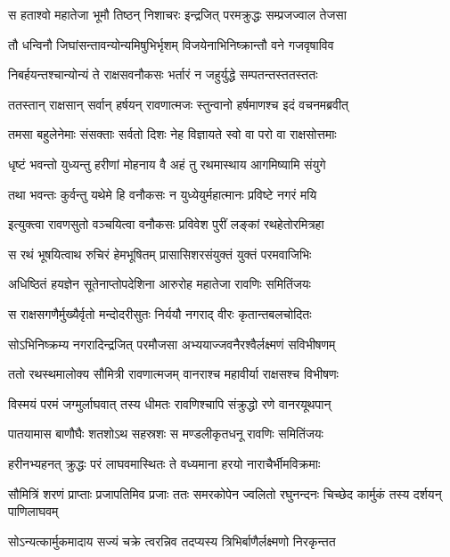 
\twolineshloka
{स हताश्वो महातेजा भूमौ तिष्ठन् निशाचरः}
{इन्द्रजित् परमक्रुद्धः सम्प्रजज्वाल तेजसा} %

\twolineshloka
{तौ धन्विनौ जिघांसन्तावन्योन्यमिषुभिर्भृशम्}
{विजयेनाभिनिष्क्रान्तौ वने गजवृषाविव} %

\twolineshloka
{निबर्हयन्तश्चान्योन्यं ते राक्षसवनौकसः}
{भर्तारं न जहुर्युद्धे सम्पतन्तस्ततस्ततः} %

\twolineshloka
{ततस्तान् राक्षसान् सर्वान् हर्षयन् रावणात्मजः}
{स्तुन्वानो हर्षमाणश्च इदं वचनमब्रवीत्} %

\twolineshloka
{तमसा बहुलेनेमाः संसक्ताः सर्वतो दिशः}
{नेह विज्ञायते स्वो वा परो वा राक्षसोत्तमाः} %

\twolineshloka
{धृष्टं भवन्तो युध्यन्तु हरीणां मोहनाय वै}
{अहं तु रथमास्थाय आगमिष्यामि संयुगे} %

\twolineshloka
{तथा भवन्तः कुर्वन्तु यथेमे हि वनौकसः}
{न युध्येयुर्महात्मानः प्रविष्टे नगरं मयि} %

\twolineshloka
{इत्युक्त्वा रावणसुतो वञ्चयित्वा वनौकसः}
{प्रविवेश पुरीं लङ्कां रथहेतोरमित्रहा} %

\twolineshloka
{स रथं भूषयित्वाथ रुचिरं हेमभूषितम्}
{प्रासासिशरसंयुक्तं युक्तं परमवाजिभिः} %

\twolineshloka
{अधिष्ठितं हयज्ञेन सूतेनाप्तोपदेशिना}
{आरुरोह महातेजा रावणिः समितिंजयः} %

\twolineshloka
{स राक्षसगणैर्मुख्यैर्वृतो मन्दोदरीसुतः}
{निर्ययौ नगराद् वीरः कृतान्तबलचोदितः} %

\twolineshloka
{सोऽभिनिष्क्रम्य नगरादिन्द्रजित् परमौजसा}
{अभ्ययाज्जवनैरश्वैर्लक्ष्मणं सविभीषणम्} %

\twolineshloka
{ततो रथस्थमालोक्य सौमित्री रावणात्मजम्}
{वानराश्च महावीर्या राक्षसश्च विभीषणः} %

\twolineshloka
{विस्मयं परमं जग्मुर्लाघवात् तस्य धीमतः}
{रावणिश्चापि संक्रुद्धो रणे वानरयूथपान्} %

\twolineshloka
{पातयामास बाणौघैः शतशोऽथ सहस्रशः}
{स मण्डलीकृतधनू रावणिः समितिंजयः} %

\twolineshloka
{हरीनभ्यहनत् क्रुद्धः परं लाघवमास्थितः}
{ते वध्यमाना हरयो नाराचैर्भीमविक्रमाः} %

\threelineshloka
{सौमित्रिं शरणं प्राप्ताः प्रजापतिमिव प्रजाः}
{ततः समरकोपेन ज्वलितो रघुनन्दनः}
{चिच्छेद कार्मुकं तस्य दर्शयन् पाणिलाघवम्} %

\twolineshloka
{सोऽन्यत्कार्मुकमादाय सज्यं चक्रे त्वरन्निव}
{तदप्यस्य त्रिभिर्बाणैर्लक्ष्मणो निरकृन्तत} %

